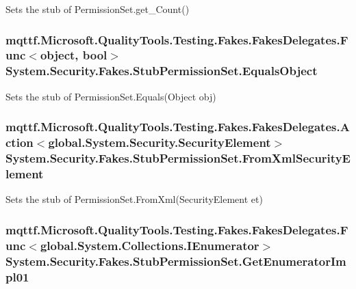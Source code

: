 Sets the stub of Permission\-Set.\-get\-\_\-\-Count()

\hypertarget{class_system_1_1_security_1_1_fakes_1_1_stub_permission_set_a70ff7df48a5a60b8334fa50ab6ebab73}{
\subsubsection[{Equals\-Object}]{\setlength{\rightskip}{0pt plus 5cm}mqttf.\-Microsoft.\-Quality\-Tools.\-Testing.\-Fakes.\-Fakes\-Delegates.\-Func$<$object, bool$>$ System.\-Security.\-Fakes.\-Stub\-Permission\-Set.\-Equals\-Object}}\label{class_system_1_1_security_1_1_fakes_1_1_stub_permission_set_a70ff7df48a5a60b8334fa50ab6ebab73}


Sets the stub of Permission\-Set.\-Equals(\-Object obj)

\hypertarget{class_system_1_1_security_1_1_fakes_1_1_stub_permission_set_a520b06db4fbce1540b4adb78695424e8}{
\subsubsection[{From\-Xml\-Security\-Element}]{\setlength{\rightskip}{0pt plus 5cm}mqttf.\-Microsoft.\-Quality\-Tools.\-Testing.\-Fakes.\-Fakes\-Delegates.\-Action$<$global.\-System.\-Security.\-Security\-Element$>$ System.\-Security.\-Fakes.\-Stub\-Permission\-Set.\-From\-Xml\-Security\-Element}}\label{class_system_1_1_security_1_1_fakes_1_1_stub_permission_set_a520b06db4fbce1540b4adb78695424e8}


Sets the stub of Permission\-Set.\-From\-Xml(\-Security\-Element et)

\hypertarget{class_system_1_1_security_1_1_fakes_1_1_stub_permission_set_ac9d4efeb7f60f14c0387a1089b9da46b}{
\subsubsection[{Get\-Enumerator\-Impl01}]{\setlength{\rightskip}{0pt plus 5cm}mqttf.\-Microsoft.\-Quality\-Tools.\-Testing.\-Fakes.\-Fakes\-Delegates.\-Func$<$global.\-System.\-Collections.\-I\-Enumerator$>$ System.\-Security.\-Fakes.\-Stub\-Permission\-Set.\-Get\-Enumerator\-Impl01}}\label{class_system_1_1_security_1_1_fakes_1_1_stub_permission_set_ac9d4efeb7f60f14c0387a1089b9da46b}


